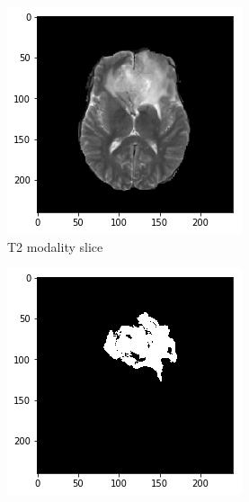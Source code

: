 \begin{figure}[H]
    \centering
    \begin{subfigure}[t]{.21\textwidth}
        \centering
        \includegraphics[width=\linewidth]{chapters/06_hdm/c_Brats18_2013_17_1_L1/51.png}
        \caption{T2 modality slice}
    \end{subfigure}%
    \begin{subfigure}[t]{.21\textwidth}
        \centering
        \includegraphics[width=\linewidth]{chapters/06_hdm/c_Brats18_2013_17_1_L1/50.png}

\end{subfigure}
\end{figure}
